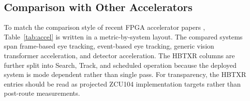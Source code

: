 \documentclass[journal]{IEEEtran}
\begin{document}
\begin{table}[t]
\caption{Source-Aligned Comparison with Representative Eye-Tracking Algorithms}
\label{tab:prior}
\centering
\scriptsize
{\setlength{\tabcolsep}{3pt}
}
\end{table}

\subsection{Comparison with Other Accelerators}
To match the comparison style of recent FPGA accelerator papers \cite{ref8,ref9,ref10,ref11,ref12}, Table~\ref{tab:accel} is written in a metric-by-system layout. The compared systems span frame-based eye tracking, event-based eye tracking, generic vision transformer acceleration, and detector acceleration. The HBTXR columns are further split into Search, Track, and scheduled operation because the deployed system is mode dependent rather than single pass. For transparency, the HBTXR entries should be read as projected ZCU104 implementation targets rather than post-route measurements.
\end{document}
